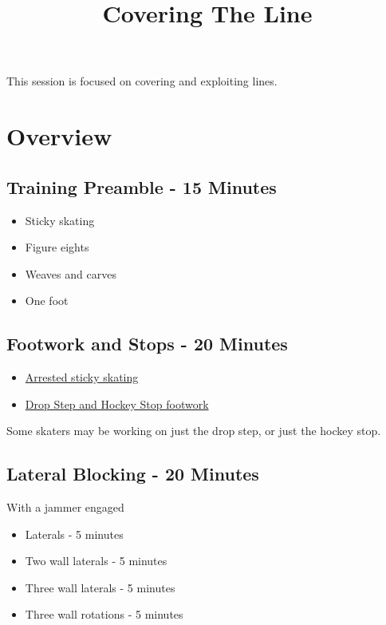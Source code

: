 \documentclass{journal}
\title{Covering The Line}
\author{}
\begin{document}
\maketitle
\noindent 

This session is focused on covering and exploiting lines.

 

\section*{Overview}

\subsection*{Training Preamble - 15 Minutes}
\begin{itemize}
\item Sticky skating
\item Figure eights
\item Weaves and carves 
\item One foot  
\end{itemize}


\subsection*{Footwork and Stops - 20 Minutes}
\begin{itemize}
\item \hyperref[drill:stopping/arrested_sticky]{Arrested sticky skating}
\item \hyperref[drill:footwork/alternating_hockeys]{Drop Step and Hockey Stop footwork}
\end{itemize}

Some skaters may be working on just the drop step, or just the hockey stop.


\subsection*{Lateral Blocking - 20 Minutes}

With a jammer engaged

\begin{itemize}
    \item Laterals - 5 minutes
    \item Two wall laterals - 5 minutes
    \item Three wall laterals - 5 minutes
    \item Three wall rotations - 5 minutes
\end{itemize}
\end{document}

